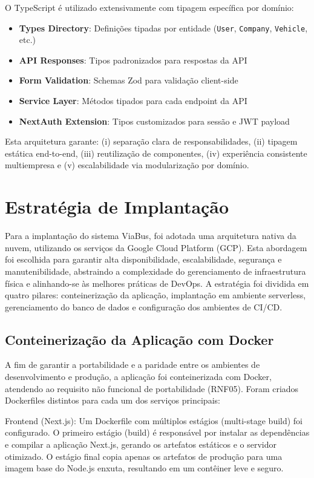 O TypeScript é utilizado extensivamente com tipagem específica por domínio:

\begin{itemize}
  \item \textbf{Types Directory}: Definições tipadas por entidade (\texttt{User}, \texttt{Company}, \texttt{Vehicle}, etc.)
  \item \textbf{API Responses}: Tipos padronizados para respostas da API
  \item \textbf{Form Validation}: Schemas Zod para validação client-side
  \item \textbf{Service Layer}: Métodos tipados para cada endpoint da API
  \item \textbf{NextAuth Extension}: Tipos customizados para sessão e JWT payload
\end{itemize}

Esta arquitetura garante: (i) separação clara de responsabilidades, (ii) tipagem estática end-to-end, (iii) reutilização de componentes, (iv) experiência consistente multiempresa e (v) escalabilidade via modularização por domínio.

\section{Estratégia de Implantação}

Para a implantação do sistema ViaBus, foi adotada uma arquitetura nativa da nuvem, utilizando os serviços da Google Cloud Platform (GCP). Esta abordagem foi escolhida para garantir alta disponibilidade, escalabilidade, segurança e manutenibilidade, abstraindo a complexidade do gerenciamento de infraestrutura física e alinhando-se às melhores práticas de DevOps. A estratégia foi dividida em quatro pilares: conteinerização da aplicação, implantação em ambiente serverless, gerenciamento do banco de dados e configuração dos ambientes de CI/CD.

\subsection{Conteinerização da Aplicação com Docker}

A fim de garantir a portabilidade e a paridade entre os ambientes de desenvolvimento e produção, a aplicação foi conteinerizada com Docker, atendendo ao requisito não funcional de portabilidade (RNF05). Foram criados Dockerfiles distintos para cada um dos serviços principais:

Frontend (Next.js): Um Dockerfile com múltiplos estágios (multi-stage build) foi configurado. O primeiro estágio (build) é responsável por instalar as dependências e compilar a aplicação Next.js, gerando os artefatos estáticos e o servidor otimizado. O estágio final copia apenas os artefatos de produção para uma imagem base do Node.js enxuta, resultando em um contêiner leve e seguro.


